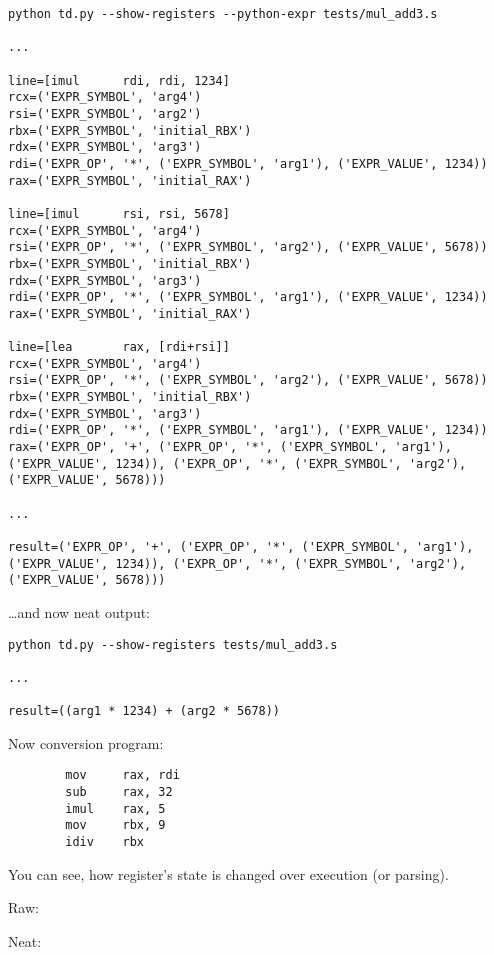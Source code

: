 \begin{lstlisting}
python td.py --show-registers --python-expr tests/mul_add3.s

...

line=[imul      rdi, rdi, 1234]
rcx=('EXPR_SYMBOL', 'arg4')
rsi=('EXPR_SYMBOL', 'arg2')
rbx=('EXPR_SYMBOL', 'initial_RBX')
rdx=('EXPR_SYMBOL', 'arg3')
rdi=('EXPR_OP', '*', ('EXPR_SYMBOL', 'arg1'), ('EXPR_VALUE', 1234))
rax=('EXPR_SYMBOL', 'initial_RAX')

line=[imul      rsi, rsi, 5678]
rcx=('EXPR_SYMBOL', 'arg4')
rsi=('EXPR_OP', '*', ('EXPR_SYMBOL', 'arg2'), ('EXPR_VALUE', 5678))
rbx=('EXPR_SYMBOL', 'initial_RBX')
rdx=('EXPR_SYMBOL', 'arg3')
rdi=('EXPR_OP', '*', ('EXPR_SYMBOL', 'arg1'), ('EXPR_VALUE', 1234))
rax=('EXPR_SYMBOL', 'initial_RAX')

line=[lea       rax, [rdi+rsi]]
rcx=('EXPR_SYMBOL', 'arg4')
rsi=('EXPR_OP', '*', ('EXPR_SYMBOL', 'arg2'), ('EXPR_VALUE', 5678))
rbx=('EXPR_SYMBOL', 'initial_RBX')
rdx=('EXPR_SYMBOL', 'arg3')
rdi=('EXPR_OP', '*', ('EXPR_SYMBOL', 'arg1'), ('EXPR_VALUE', 1234))
rax=('EXPR_OP', '+', ('EXPR_OP', '*', ('EXPR_SYMBOL', 'arg1'), ('EXPR_VALUE', 1234)), ('EXPR_OP', '*', ('EXPR_SYMBOL', 'arg2'), ('EXPR_VALUE', 5678)))

...

result=('EXPR_OP', '+', ('EXPR_OP', '*', ('EXPR_SYMBOL', 'arg1'), ('EXPR_VALUE', 1234)), ('EXPR_OP', '*', ('EXPR_SYMBOL', 'arg2'), ('EXPR_VALUE', 5678)))
\end{lstlisting}

\dots and now neat output:

\begin{lstlisting}
python td.py --show-registers tests/mul_add3.s

...

result=((arg1 * 1234) + (arg2 * 5678))
\end{lstlisting}

Now conversion program:

\begin{lstlisting}
        mov     rax, rdi
        sub     rax, 32
        imul    rax, 5
        mov     rbx, 9
        idiv    rbx
\end{lstlisting}

You can see, how register's state is changed over execution (or parsing).

Raw:



Neat:

